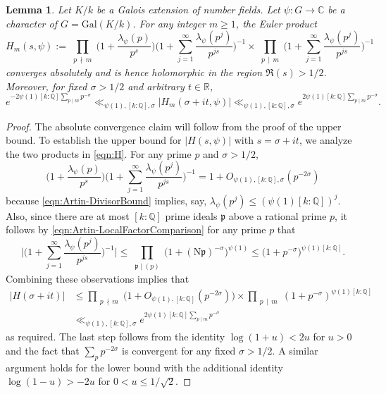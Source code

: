 \documentclass[12pt]{amsart}
\newtheorem{lemma}[theorem]{Lemma}
\theoremstyle{definition} \newtheorem{definition}[theorem]{Definition}
\theoremstyle{example} \newtheorem{example}[theorem]{Example}
\theoremstyle{remark} \newtheorem{remark}{Remark}[theorem]
\numberwithin{equation}{section}
\numberwithin{theorem}{section}
\renewcommand{\leq}{\leqslant}
\renewcommand{\geq}{\geqslant}
\newcommand{\Q}{\mathbb{Q}}
\newcommand{\kp}{\mathfrak{p}}
\begin{document}
\begin{lemma}	\label{lem:FiniteEulerProduct}	
Let $K/k$ be a Galois extension of number fields. Let $\psi : G \to \mathbb{C}$ be a character of $G=\mathrm{Gal}(K/k)$. For any integer $m \geq 1$, the Euler product
\begin{equation} \label{eqn:H}
H_{m}(s,\psi)  := 
 \prod_{\substack{p \,\nmid \,  m}} \Big(1 + \frac{\lambda_{\psi}(p)}{p^s} \Big) \Big( 1 + \sum_{j=1}^{\infty} \frac{\lambda_{\psi}(p^j)}{p^{js}} \Big)^{-1}  
 \times  \prod_{\substack{p \,\mid\, m }}\Big( 1 + \sum_{j=1}^{\infty} \frac{\lambda_{\psi}(p^j)}{p^{js}} \Big)^{-1}  
\end{equation}
converges absolutely and is hence holomorphic in the region $\Re(s) > 1/2$. Moreover, for fixed $\sigma > 1/2$ and arbitrary $t \in \mathbb{R}$, 
\[
e^{-2\psi(1) [k:\Q] \sum_{p \mid m} p^{-\sigma}}     \ll_{\psi(1), [k:\Q], \sigma} |H_{m}(\sigma+it,\psi)| \ll_{\psi(1), [k:\Q],\sigma}   e^{2\psi(1) [k:\Q]  \sum_{p \mid m} p^{-\sigma} }.
\]
\end{lemma}
\begin{proof} The absolute convergence claim will follow from the proof of the upper bound. To establish the upper bound for $|H(s,\psi)|$ with $s = \sigma+it$, we analyze the two products in \eqref{eqn:H}. For any prime $p$ and $\sigma > 1/2$, 
\[
\Big(1 + \frac{\lambda_{\psi}(p)}{p^s} \Big) \Big( 1 + \sum_{j=1}^{\infty} \frac{\lambda_{\psi}(p^j)}{p^{js}} \Big)^{-1} = 1 + O_{\psi(1),[k:\Q],\sigma}(p^{-2\sigma}) 
\]
because \eqref{eqn:Artin-DivisorBound} implies, say, $\lambda_{\psi}(p^j) \leq (\psi(1) [k:\Q])^j$. Also, since there are at most $[k:\Q]$ prime ideals $\kp$ above a rational prime $p$, it follows by \eqref{eqn:Artin-LocalFactorComparison} for any prime $p$ that   
\[
\Big| \Big( 1 + \sum_{j=1}^{\infty} \frac{\lambda_{\psi}(p^j)}{p^{js}} \Big)^{-1}\Big| \leq \prod_{\substack{\kp \mid (p)  }} \big( 1  +  (\mathrm{N}\mathfrak{p})^{-\sigma}\big)^{\psi(1)} \leq  \big(1+p^{-\sigma} \big)^{\psi(1) [k:\Q]}. 
\]
Combining these observations implies that 
\begin{align*}
|H(\sigma+it)| 
& \leq \prod_{\substack{p \,\nmid \,  m}} \Big(1 + O_{\psi(1),[k:\Q]}(p^{-2\sigma}) \Big)  \times \prod_{\substack{ p \,\mid \,  m}} (1+p^{-\sigma})^{\psi(1)[k:\Q]}  \\
& \ll_{\psi(1),[k:\Q],\sigma}   e^{  2 \psi(1)[k:\Q] \sum_{p \mid m} p^{-\sigma}}
\end{align*} 
as required. The last step follows from the identity $\log(1+u) < 2u$ for $u > 0$ and the fact that $\sum_p p^{-2\sigma}$ is convergent for any fixed $\sigma > 1/2$. A similar argument holds for the lower bound with the additional identity $\log(1-u) > -2u$ for $0 < u \leq 1/\sqrt{2}$.  
\end{proof}
\end{document}
